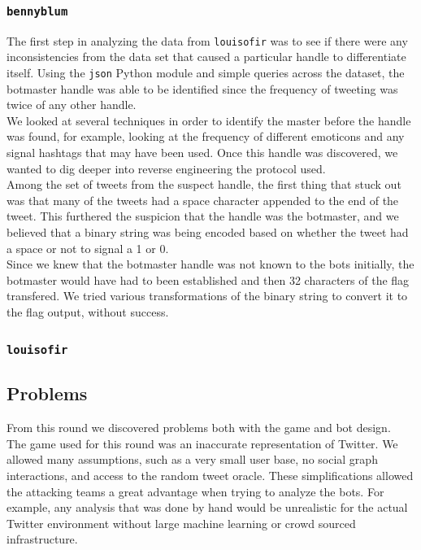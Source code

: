 \documentclass[11pt, oneside]{article} %
\numberwithin{equation}{section} %
\numberwithin{figure}{section} %
\numberwithin{table}{section} %
\renewcommand{\c}[1]{\texttt{#1}}
\newcommand{\teambb}{\c{bennyblum}}
\newcommand{\teamol}{\c{louisofir}}
\begin{document}
		\subsubsection{\teambb{}}
			The first step in analyzing the data from \teamol{} was to see if there were any inconsistencies from the data set that caused a particular handle to differentiate itself. Using the \c{json} Python module  and simple queries across the dataset, the botmaster handle was able to be identified since the frequency of tweeting was twice of any other handle. \\

			We looked at several techniques in order to identify the master before the handle was found, for example, looking at the frequency of different emoticons and any signal hashtags that may have been used. Once this handle was discovered, we wanted to dig deeper into reverse engineering the protocol used. \\

			Among the set of tweets from the suspect handle, the first thing that stuck out was that many of the tweets had a space character appended to the end of the tweet. This furthered the suspicion that the handle was the botmaster, and we believed that a binary string was being encoded based on whether the tweet had a space or not to signal a 1 or 0. \\

			Since we knew that the botmaster handle was not known to the bots initially, the botmaster would have had to been established and then 32 characters of the flag transfered. We tried various transformations of the binary string to convert it to the flag output, without success. 

		\subsubsection{\teamol{}}

	\subsection{Problems}
		From this round we discovered problems both with the game and bot design. \\

		The game used for this round was an inaccurate representation of Twitter. We allowed many assumptions, such as a very small user base, no social graph interactions, and access to the random tweet oracle. These simplifications allowed the attacking teams a great advantage when trying to analyze the bots. For example, any analysis that was done by hand would be unrealistic for the actual Twitter environment without large machine learning or crowd sourced infrastructure. \\ 
		
\end{document}
